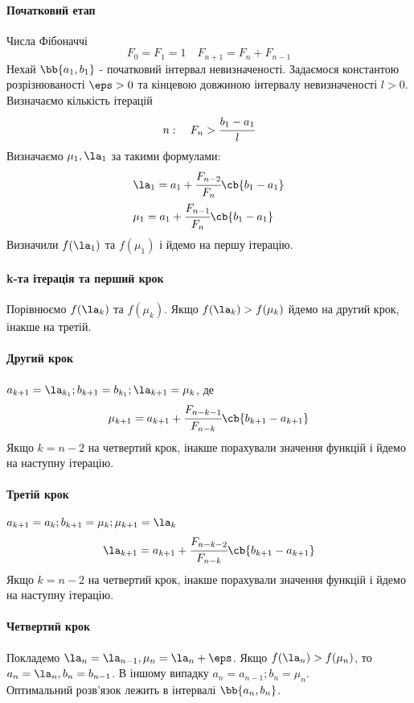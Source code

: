 \paragraph{Початковий етап} Числа Фібоначчі
\begin{equation*}
	F_0 = F_1 = 1 \quad F_{n+1} = F_n + F_{n-1}
\end{equation*}
Нехай $\bb{a_1,b_1}$ - початковий інтервал невизначеності. Задаємося константою розрізнюваності $\eps>0$ та кінцевою довжиною інтервалу невизначеності $l>0$. Визначаємо кількість ітерацій
\begin{equation}
	n:\quad F_n > \cfrac{b_1 - a_1}{l}
\end{equation}
Визначаємо $\mu_1,\la_1$ за такими формулами:
\begin{eqnarray}
	&\la_1 = a_1 + \cfrac{F_{n-2}}{F_n} \cb{b_1-a_1}\\
	&\mu_1 = a_1 + \cfrac{F_{n-1}}{F_n} \cb{b_1-a_1}
\end{eqnarray}
Визначили $f(\la_1)$ та $f(\mu_1)$ і йдемо на першу ітерацію.
\paragraph{k-та ітерація та перший крок} Порівнюємо $f(\la_k)$ та $f(\mu_k)$. Якщо $f(\la_k)>f(\mu_k)$ йдемо на другий крок, інакше на третій.
\paragraph{Другий крок} 
$a_{k+1} = \la_{k_1}; b_{k+1} = b_{k_1}; \la_{k+1} = \mu_k$, де
\begin{equation}
	\mu_{k+1} = a_{k+1} + \cfrac{F_{n-k-1}}{F_{n-k}} \cb{b_{k+1} - a_{k+1}}
\end{equation}
Якщо $k=n-2$ на четвертий крок, інакше порахували значення функцій і йдемо на наступну ітерацію.
\paragraph{Третій крок}
$a_{k+1} = a_{k}; b_{k+1} = \mu_k; \mu_{k+1} = \la_k$
\begin{equation}
	\la_{k+1} = a_{k+1} + \cfrac{F_{n-k-2}}{F_{n-k}} \cb{b_{k+1} - a_{k+1}}
\end{equation}
Якщо $k=n-2$ на четвертий крок, інакше порахували значення функцій і йдемо на наступну ітерацію.
\paragraph{Четвертий крок}
Покладемо $\la_n = \la_{n-1},\mu_n = \la_n + \eps$. Якщо $f(\la_n)>f(\mu_n)$, то $a_n=\la_n, b_n=b_{n-1}$. В іншому випадку $a_n = a_{n-1};b_n = \mu_n$.\\
Оптимальний розв’язок лежить в інтервалі $\bb{a_n,b_n}$.
